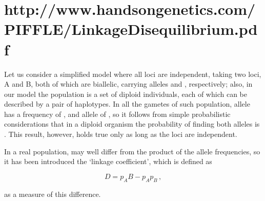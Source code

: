 \documentclass[../main.tex]{subfiles}
\begin{document}
\section{http://www.handsongenetics.com/PIFFLE/LinkageDisequilibrium.pdf}

Let us consider a simplified model where all loci are independent, 
taking two loci, A and B, both of which are biallelic, carrying alleles 
 and , respectively; also, in our model the 
population is a set of diploid individuals, each of which can be 
described by a pair of haplotypes. In all the gametes of such 
population, allele  has a frequency of , and allele 
 of , so it follows from simple probabilistic 
considerations that in a diploid organism the probability of finding 
both alleles is . This result, however, holds true 
only as long as the loci are independent.

In a real population,  may well differ from the product of 
the allele frequencies, so it has been introduced the `linkage 
coefficient', which is defined as

\begin{equation}
\label{eq:linkagecoeff}
D = p_AB - p_A p_B\,,
\end{equation}

as a measure of this difference.
\end{document}
